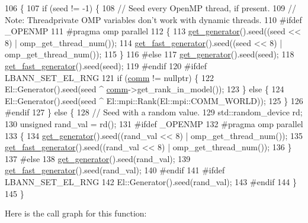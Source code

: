 \begin{DoxyCode}
106                                              \{
107   \textcolor{keywordflow}{if} (seed != -1) \{
108     \textcolor{comment}{// Seed every OpenMP thread, if present.}
109     \textcolor{comment}{// Note: Threadprivate OMP variables don't work with dynamic threads.}
110 \textcolor{preprocessor}{#ifdef \_OPENMP}
111 \textcolor{preprocessor}{    #pragma omp parallel}
112     \{
113       \hyperlink{namespacelbann_a4fea7ba21017b49d1e34394b4c20c764}{get\_generator}().seed((seed << 8) | omp\_get\_thread\_num());
114       \hyperlink{namespacelbann_ae6ce9c2fdec6f81803f6b1a6555c31c5}{get\_fast\_generator}().seed((seed << 8) | omp\_get\_thread\_num());
115     \}
116 \textcolor{preprocessor}{#else}
117     \hyperlink{namespacelbann_a4fea7ba21017b49d1e34394b4c20c764}{get\_generator}().seed(seed);
118     \hyperlink{namespacelbann_ae6ce9c2fdec6f81803f6b1a6555c31c5}{get\_fast\_generator}().seed(seed);
119 \textcolor{preprocessor}{#endif}
120 \textcolor{preprocessor}{#ifdef LBANN\_SET\_EL\_RNG}
121     \textcolor{keywordflow}{if} (\hyperlink{file__io_8cpp_ab048c6f9fcbcfaa57ce68b00263dbebe}{comm} != \textcolor{keyword}{nullptr}) \{
122       El::Generator().seed(seed ^ \hyperlink{file__io_8cpp_ab048c6f9fcbcfaa57ce68b00263dbebe}{comm}->get\_rank\_in\_model());
123     \} \textcolor{keywordflow}{else} \{
124       El::Generator().seed(seed ^ El::mpi::Rank(El::mpi::COMM\_WORLD));
125     \}
126 \textcolor{preprocessor}{#endif}
127   \} \textcolor{keywordflow}{else} \{
128     \textcolor{comment}{// Seed with a random value.}
129     std::random\_device rd;
130     \textcolor{keywordtype}{unsigned} rand\_val = rd();
131 \textcolor{preprocessor}{#ifdef \_OPENMP}
132 \textcolor{preprocessor}{    #pragma omp parallel}
133     \{
134       \hyperlink{namespacelbann_a4fea7ba21017b49d1e34394b4c20c764}{get\_generator}().seed((rand\_val << 8) | omp\_get\_thread\_num());
135       \hyperlink{namespacelbann_ae6ce9c2fdec6f81803f6b1a6555c31c5}{get\_fast\_generator}().seed((rand\_val << 8) | omp\_get\_thread\_num());
136     \}
137 \textcolor{preprocessor}{#else}
138     \hyperlink{namespacelbann_a4fea7ba21017b49d1e34394b4c20c764}{get\_generator}().seed(rand\_val);
139     \hyperlink{namespacelbann_ae6ce9c2fdec6f81803f6b1a6555c31c5}{get\_fast\_generator}().seed(rand\_val);
140 \textcolor{preprocessor}{#endif}
141 \textcolor{preprocessor}{#ifdef LBANN\_SET\_EL\_RNG}
142     El::Generator().seed(rand\_val);
143 \textcolor{preprocessor}{#endif}
144   \}
145 \}
\end{DoxyCode}
Here is the call graph for this function\+:\nopagebreak
